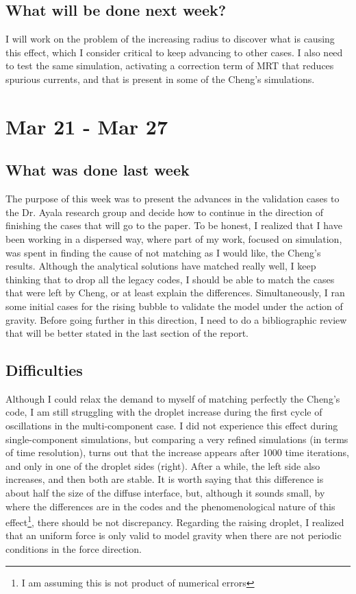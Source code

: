 \documentclass[12pt]{article}
\begin{document}
	\subsection*{What will be done next week?}
	I will work on the problem of the increasing radius to discover what is causing this effect, which I consider critical to keep advancing to other cases. I also need to test the same simulation, activating a correction term of MRT that reduces spurious currents, and that is present in some of the Cheng's simulations.
	
	\pagebreak
	\section*{Mar 21 - Mar 27}
	\subsection*{What was done last week}
		The purpose of this week was to present the advances in the validation cases to the Dr. Ayala research group and decide how to continue in the direction of finishing the cases that will go to the paper. To be honest, I realized that I have been working in a dispersed way, where part of my work, focused on simulation, was spent in finding the cause of not matching as I would like, the Cheng's results. Although the analytical solutions have matched really well, I keep thinking that to drop all the legacy codes, I should be able to match the cases that were left by Cheng, or at least explain the differences. Simultaneously, I ran some initial cases for the rising bubble to validate the model under the action of gravity. Before going further in this direction, I need to do a bibliographic review that will be better stated in the last section of the report. 
		
	\subsection*{Difficulties}
	
	Although I could relax the demand to myself of matching perfectly the Cheng's code, I am still struggling with the droplet increase during the first cycle of oscillations in the multi-component case. I did not experience this effect during single-component simulations, but comparing a very refined simulations (in terms of time resolution), turns out that the increase appears after 1000 time iterations, and only in one of the droplet sides (right). After a while, the left side also increases, and then both are stable. It is worth saying that this difference is about half the size of the diffuse interface, but, although it sounds small, by where the differences are in the codes and the phenomenological nature of this effect\footnote{I am assuming this is not product of numerical errors}, there should be not discrepancy. Regarding the raising droplet, I realized that an uniform force is only valid to model gravity when there are not periodic conditions in the force direction.
	
\end{document}
